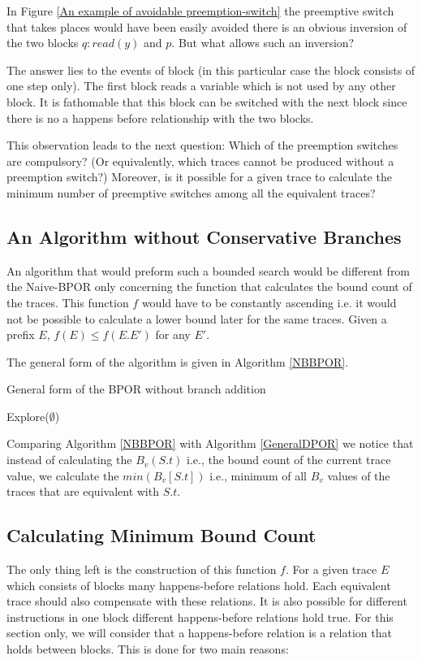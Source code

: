 In Figure \ref{An example of avoidable preemption-switch} the preemptive switch that takes places would have been easily
avoided there is an obvious inversion of the two blocks $q:read(y)$ and $p$. But what allows such an inversion?

The answer lies to the events of block (in this particular case the block consists of one step only). The first block
reads a variable which is not used by any other block. It is fathomable that this block can be switched with the next
block since there is no a happens before relationship with the two blocks.

This observation leads to the next question: Which of the preemption switches are compulsory? (Or equivalently, which
traces cannot be produced without a preemption switch?) Moreover, is it possible for a given trace to calculate the
minimum number of preemptive switches among all the equivalent traces?

\subsection{An Algorithm without Conservative Branches}
An algorithm that would preform such a bounded search would be different from the Naive-BPOR only concerning the
function that calculates the bound count of the traces. This function $f$ would have to be constantly ascending i.e. it
would not be possible to calculate a lower bound later for the same traces. Given a prefix $E$, $f(E) \leq f(E.E')$ for
any $E'$.

The general form of the algorithm is given in Algorithm \ref{NBBPOR}.

\begin{algorithm}[H]
    \SetAlgoLined
    \caption{General form of the BPOR without branch addition}
    \label{NBBPOR}
    Explore($\emptyset$)\;
\end{algorithm}

Comparing Algorithm \ref{NBBPOR} with Algorithm \ref{GeneralDPOR} we notice that instead of calculating the $B_v(S.t)$ i.e., the
bound count of the current trace value, we calculate the $min(B_v[S.t])$ i.e., minimum of all $B_v$ values of the traces
that are equivalent with $S.t$.

\subsection{Calculating Minimum Bound Count}
The only thing left is the construction of this function $f$. For a given trace $E$ which consists of blocks many
happens-before relations hold. Each equivalent trace should also compensate with these relations. It is also possible
for different instructions in one block different happens-before relations hold true. For this section only, we will
consider that a happens-before relation is a relation that holds between blocks. This is done for two main reasons:

